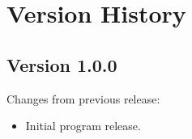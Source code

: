 \documentclass[11pt,titlepage,twoside]{article}
\begin{document}



\section{Version History}

\subsection{Version 1.0.0}

\noindent
Changes from previous release:
\begin{itemize}
\item Initial program release.
\end{itemize}




\end{document}
